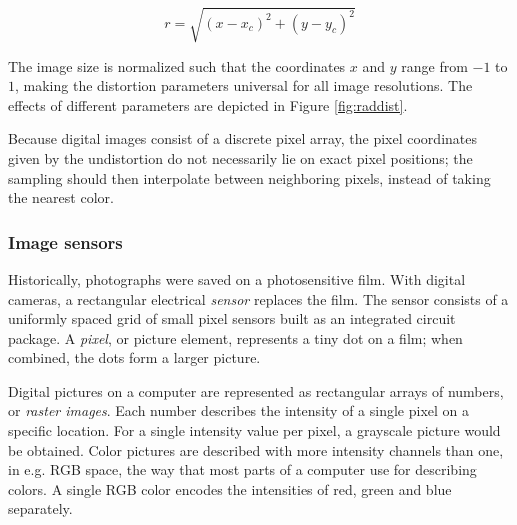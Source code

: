 \begin{equation}
r = \sqrt{(x - x_c)^2 + (y - y_c)^2}
\end{equation}


The image size is normalized such that the coordinates $x$ and $y$ range from $-1$ to $1$, making the distortion parameters universal for all image resolutions.
The effects of different parameters are depicted in Figure \ref{fig:raddist}.


Because digital images consist of a discrete pixel array, the pixel coordinates given by the undistortion do not necessarily lie on exact pixel positions; the sampling should then interpolate between neighboring pixels, instead of taking the nearest color. \cite{wolberg1990digital}




\subsubsection{Image sensors} \label{sec:sensors} %


Historically, photographs were saved on a photosensitive film.
With digital cameras, a rectangular electrical \emph{sensor} replaces the film.
The sensor consists of a uniformly spaced grid of small pixel sensors built as an integrated circuit package.
A \emph{pixel}, or picture element, represents a tiny dot on a film; when combined, the dots form a larger picture.


Digital pictures on a computer are represented as rectangular arrays of numbers, or \emph{raster images}.
Each number describes the intensity of a single pixel on a specific location.
For a single intensity value per pixel, a grayscale picture would be obtained.
Color pictures are described with more intensity channels than one, in e.g. RGB space, the way that most parts of a computer use for describing colors.
A single RGB color encodes the intensities of red, green and blue separately.

